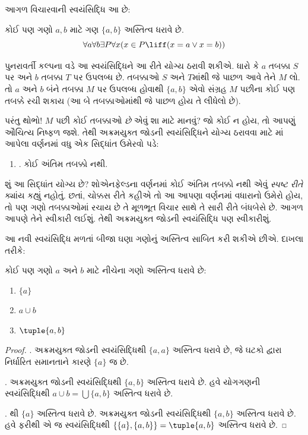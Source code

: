 \documentclass[../../../include/open-logic-section]{subfiles}
\begin{document}

આગળ વિચારવાની સ્વયંસિદ્ધિ આ છે:

\begin{axiom}[અક્રમયુક્ત જોડ]
કોઈ પણ ગણો $a, b$ માટે ગણ $\{a, b\}$ અસ્તિત્વ ધરાવે છે.
\[
\forall a \forall b \exists P \forall x (x \in P \liff (x = a \lor x = b))
\]
\end{axiom}

પુનરાવર્તી કલ્પના વડે આ સ્વયંસિદ્ધિને આ રીતે યોગ્ય ઠરાવી શકીએ.
ધારો કે $a$ તબક્કા $S$ પર અને $b$ તબક્કા $T$ પર ઉપલબ્ધ છે.
તબક્કાઓ $S$ અને $T$માંથી જે પાછળ આવે તેને $M$ લો. તો $a$ અને
$b$ બંને તબક્કા $M$ પર ઉપલબ્ધ હોવાથી $\{a,b\}$ એવો સંગ્રહ
$M$ પછીના કોઈ પણ તબક્કે રચી શકાય (આ બે તબક્કાઓમાંથી જે પાછળ હોય
તે લીધેલો છે).

પરંતુ થોભો!{} $M$ પછી કોઈ તબક્કાઓ \emph{છે} એવું શા માટે માનવું?
જો કોઈ ન હોય, તો આપણું ઔચિત્ય નિષ્ફળ જશે. તેથી અક્રમયુક્ત જોડની
સ્વયંસિદ્ધિને યોગ્ય ઠરાવવા માટે માં
આપેલા વર્ણનમાં વધુ એક સિદ્ધાંત ઉમેરવો પડે:
\begin{enumerate}
\item[] \stagessucc. કોઈ અંતિમ તબક્કો નથી.
\end{enumerate}
શું આ સિદ્ધાંત યોગ્ય છે? શોએનફેલ્ડના વર્ણનમાં કોઈ અંતિમ તબક્કો
નથી એવું \emph{સ્પષ્ટ રીતે} ક્યાંય કહ્યું નહોતું. છતાં,
ચોક્કસ રીતે કહીએ તો આ આપણા વર્ણનમાં વધારાનો ઉમેરો હોય, તો પણ
ગણો તબક્કાઓમાં રચાય છે તે મૂળભૂત વિચાર સાથે તે સારી રીતે બંધબેસે
છે. આગળ આપણે તેને સ્વીકારી લઈશું. તેથી અક્રમયુક્ત જોડની
સ્વયંસિદ્ધિ પણ સ્વીકારીશું.

આ નવી સ્વયંસિદ્ધિ મળતાં બીજા ઘણા ગણોનું અસ્તિત્વ સાબિત કરી
શકીએ છીએ. દાખલા તરીકે:

\begin{prop}
કોઈ પણ ગણો $a$ અને $b$ માટે નીચેના ગણો અસ્તિત્વ ધરાવે છે:
\begin{enumerate}
\item{} $\{a\}$
\item{} $a \cup b$
\item{} $\tuple{a, b}$
\end{enumerate}
\end{prop}

\begin{proof}
. અક્રમયુક્ત જોડની સ્વયંસિદ્ધિથી $\{a, a\}$
અસ્તિત્વ ધરાવે છે, જે ઘટકો દ્વારા નિર્ધારિત સમાનતાને કારણે
$\{a\}$ જ છે.

. અક્રમયુક્ત જોડની સ્વયંસિદ્ધિથી $\{a, b\}$
અસ્તિત્વ ધરાવે છે. હવે યોગગણની સ્વયંસિદ્ધિથી
$a \cup b = \bigcup
\{a, b\}$ અસ્તિત્વ ધરાવે છે.

. થી $\{a\}$ અસ્તિત્વ ધરાવે છે.
અક્રમયુક્ત જોડની સ્વયંસિદ્ધિથી $\{a,
b\}$ અસ્તિત્વ ધરાવે છે. હવે ફરીથી એ જ સ્વયંસિદ્ધિથી
$\{\{a\}, \{a, b\}\} = \tuple{a, b}$ અસ્તિત્વ ધરાવે છે.
\end{proof}
\end{document}
